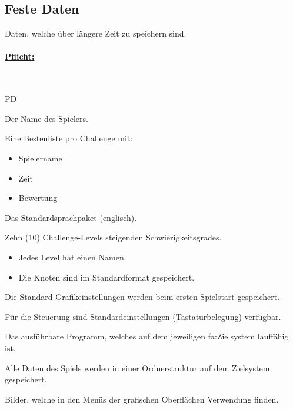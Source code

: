 %
%


\subsection{Feste Daten}
\label{PD:persDat}

Daten, welche über längere Zeit zu speichern sind.\\


%
%
\paragraph*{\underline{Pflicht:}}~\\


\begin{ids}{\gls{PD}}

	\id[ 10] Der Name des Spielers.
	
	\id[ 20] Eine Bestenliste pro Challenge mit:
	
		\begin{itemize}
		
			\item Spielername
			\item Zeit
			\item Bewertung
			
		\end{itemize}
	
	\id[ 30] Das Standardsprachpaket (englisch).
	
	\id[ 40] Zehn (10) Challenge-Levels steigenden Schwierigkeitsgrades.
	
	\begin{itemize}
	
		\item Jedes Level hat einen Namen.
		\item Die Knoten sind im Standardformat gespeichert.
		
	\end{itemize}
	
	\id[ 50] Die Standard-Grafikeinstellungen werden beim ersten Spielstart gespeichert.
	
	\id[ 60] Für die Steuerung sind Standardeinstellungen (Tastaturbelegung) verfügbar.
		
	\id[ 80] Das ausführbare Programm, welches auf dem jeweiligen \gls{fa:Zielsystem} lauffähig ist.
	
	\id[ 90] Alle Daten des Spiels werden in einer Ordnerstruktur auf dem Zielsystem gespeichert.
		
	\id[110] Bilder, welche in den Menüs der grafischen Oberflächen Verwendung finden.
	
\end{ids}



